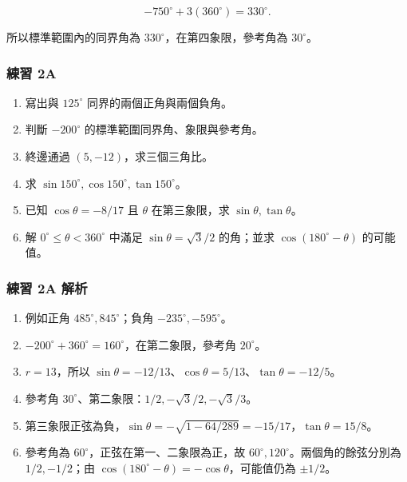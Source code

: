 \documentclass[11pt,a4paper]{article}
\providecommand{\tightlist}{%
  \setlength{\itemsep}{0pt}\setlength{\parskip}{0pt}}
\begin{document}
\[
-750^\circ+3(360^\circ)=330^\circ.
\]

所以標準範圍內的同界角為 \(\boxed{330^\circ}\)，在第四象限，參考角為 \(30^\circ\)。

\subsubsection{練習 2A}\label{ux7df4ux7fd2-2a}

\begin{enumerate}
\def\labelenumi{\arabic{enumi}.}
\tightlist
\item
  寫出與 \(125^\circ\) 同界的兩個正角與兩個負角。
\item
  判斷 \(-200^\circ\) 的標準範圍同界角、象限與參考角。
\item
  終邊通過 \((5,-12)\)，求三個三角比。
\item
  求 \(\sin150^\circ,\cos150^\circ,\tan150^\circ\)。
\item
  已知 \(\cos\theta=-8/17\) 且 \(\theta\) 在第三象限，求 \(\sin\theta,\tan\theta\)。
\item
  解 \(0^\circ\le\theta<360^\circ\) 中滿足 \(\sin\theta=\sqrt3/2\) 的角；並求 \(\cos(180^\circ-\theta)\) 的可能值。
\end{enumerate}

\subsubsection{練習 2A 解析}\label{ux7df4ux7fd2-2a-ux89e3ux6790}

\begin{enumerate}
\def\labelenumi{\arabic{enumi}.}
\tightlist
\item
  例如正角 \(\boxed{485^\circ,845^\circ}\)；負角 \(\boxed{-235^\circ,-595^\circ}\)。
\item
  \(-200^\circ+360^\circ=160^\circ\)，在第二象限，參考角 \(\boxed{20^\circ}\)。
\item
  \(r=13\)，所以 \(\sin\theta=\boxed{-12/13}\)、\(\cos\theta=\boxed{5/13}\)、\(\tan\theta=\boxed{-12/5}\)。
\item
  參考角 \(30^\circ\)、第二象限：\(\boxed{1/2,-\sqrt3/2,-\sqrt3/3}\)。
\item
  第三象限正弦為負，\(\sin\theta=-\sqrt{1-64/289}=\boxed{-15/17}\)，\(\tan\theta=\boxed{15/8}\)。
\item
  參考角為 \(60^\circ\)，正弦在第一、二象限為正，故 \(\boxed{60^\circ,120^\circ}\)。兩個角的餘弦分別為 \(1/2,-1/2\)；由 \(\cos(180^\circ-\theta)=-\cos\theta\)，可能值仍為 \(\boxed{\pm1/2}\)。
\end{enumerate}
\end{document}
